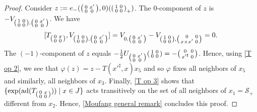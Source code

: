 \documentclass[oneside,a4paper]{amsart} %
\theoremstyle{definition}
\DeclareMathOperator{\ad}{ad}
\numberwithin{equation}{section}
\begin{document}
\begin{proof}
	Consider $z:=e_-(\begin{psmallmatrix} 0&x'\\0&0 \end{psmallmatrix},0)(\begin{psmallmatrix} 1&0\\0&0 \end{psmallmatrix}_+)$.
	The $0$-component of $z$ is $-V_{\begin{psmallmatrix} 1&0\\0&0 \end{psmallmatrix},\begin{psmallmatrix} 0&x'\\0&0 \end{psmallmatrix}}$.
	We have 
	\[[T_{\begin{psmallmatrix} 0&x\\0&0 \end{psmallmatrix}},V_{\begin{psmallmatrix} 1&0\\0&0 \end{psmallmatrix},\begin{psmallmatrix} 0&x'\\0&0 \end{psmallmatrix}}]=V_{0,\begin{psmallmatrix} 0&x'\\0&0 \end{psmallmatrix}}-V_{\begin{psmallmatrix} 1&0\\0&0 \end{psmallmatrix},\begin{psmallmatrix} 0&0\\x\times x'&0 \end{psmallmatrix}}=0.\]
	The $(-1)$-component of $z$ equals $-\frac{1}{2}U_{\begin{psmallmatrix} 0&x'\\0&0 \end{psmallmatrix}}\begin{psmallmatrix} 1&0\\0&0 \end{psmallmatrix}=-\begin{psmallmatrix} 0&0\\x'^\sharp &0 \end{psmallmatrix}$.
	Hence, using \cref{T op 2}, we see that $\varphi(z)=z-T(x'^\sharp,x) x_5$ and so $\varphi$ fixes all neighbors of $x_5$ and similarly, all neighbors of $x_3$.
	Finally, \cref{T op 3} shows that $\{\exp(\ad(T_{\begin{psmallmatrix} 0&x\\0&0 \end{psmallmatrix}}))\mid x\in J\}$ acts transitively on the set of all neighbors of $x_1=\mathcal S_+$ different from $x_2$.
	Hence, \cref{Moufang general remark} concludes this proof.
	\end{proof}
\end{document}
